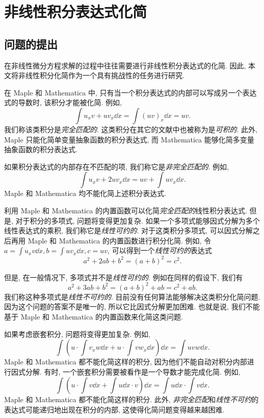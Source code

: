 \chapter{非线性积分表达式化简}\label{ch06}
\section{问题的提出}
在非线性微分方程求解的过程中往往需要进行非线性积分表达式的化简. 因此, 本文将非线性积分化简作为一个具有挑战性的任务进行研究.

在 Maple 和 Mathematica 中, 只有当一个积分表达式的内部可以写成另一个表达式的导数时, 该积分才能被化简. 例如, 
\begin{equation}
\int\!{u_xv+uv_x \dd x}=\int\!{(uv)_x\dd x}=uv.
\label{complete_matched}
\end{equation}
我们称该类积分是\emph{完全匹配的}. 这类积分在其它的文献中也被称为是\emph{可积的}. 此外, Maple 只能化简单变量抽象函数的积分表达式, 而 Mathematica 能够化简多变量抽象函数的积分表达式. 

如果积分表达式的内部存在不匹配的项, 我们称它是\emph{非完全匹配的}. 例如,
\begin{equation}
\int\!{u_xv+2uv_x \dd x}=uv+\int\!{uv_x\dd x}.
\label{incomplete_matched}
\end{equation}
Maple 和 Mathematica 均不能化简上述积分表达式. 

利用 Maple 和 Mathematica 的内置函数可以化简\emph{完全匹配的}线性积分表达式. 但是, 对于积分的多项式, 问题将变得更加复杂. 如果一个多项式能够因式分解为多个线性表达式的乘积, 我们称它是\emph{线性可约的}. 对于这类积分多项式, 可以因式分解之后再用 Maple 和 Mathematica 的内置函数进行积分化简. 例如, 令$a=\int{u_x v \dd x},b=\int{u v_x \dd x},c=uv$, 可以得到一个\emph{线性可约的}表达式
\begin{equation}
a^2+2ab+b^2=(a+b)^2=c^2.
\label{liner_reducible}
\end{equation}

但是, 在一般情况下, 多项式并不是\emph{线性可约的}. 例如在同样的假设下, 我们有
\begin{equation}
a^2+3ab+b^2=(a+b)^2+ab=c^2+ab.
\label{non_linear_reducible}
\end{equation} 
我们称这种多项式是\emph{线性不可约的}. 目前没有任何算法能够解决这类积分化简问题. 因为这个问题的答案不是唯一的, 所以它比因式分解更加困难. 也就是说, 我们不能基于 Maple 和 Mathematica 的内置函数来化简这类问题. 

如果考虑嵌套积分, 问题将变得更加复杂. 例如, 
\begin{equation}
\int\!{\left(u\cdot\int\!{v_xw\dd x}+u\cdot\int\!{vw_x\dd x}\right)\dd x}=\int\!{uvw\dd x}.
\label{nested_integral}
\end{equation}
Maple 和 Mathematica 都不能化简这样的积分, 因为他们不能自动对积分内部进行因式分解. 有时, 一个嵌套积分需要被看作是一个导数才能完成化简. 例如,
\begin{equation}
\int\!{\left(u\cdot\int\!{v\dd x}+\int\!{u\dd x}\cdot v\right)\dd x}=\int\!{u\dd x}\cdot\int\!{v\dd x}.
\label{integral_as_differential}
\end{equation}
Maple 和 Mathematica 都不能化简这样的积分. 此外, \emph{非完全匹配}和\emph{线性不可约}的表达式可能递归地出现在积分的内部, 这使得化简问题变得越来越困难.

